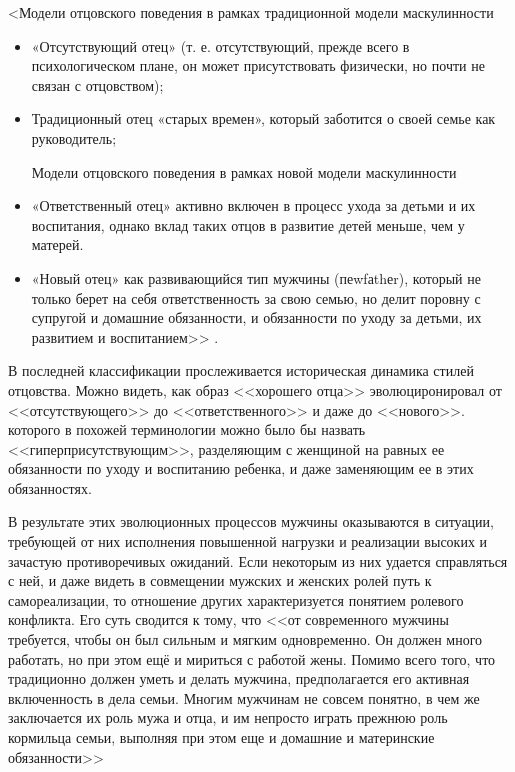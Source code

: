 \documentclass{../../common/thesisbyxetex}
\begin{document}
<Модели отцовского поведения в рамках традиционной модели маскулинности

\begin{itemize}

	\item «Отсутствующий отец» (т. е. отсутствующий, прежде всего в психологическом плане, он может
присутствовать физически, но почти не связан с отцовством);

\item Традиционный отец «старых времен», который заботится о своей семье как руководитель;

Модели отцовского поведения в рамках новой модели маскулинности
	\item «Ответственный отец» активно включен в процесс ухода за детьми и их воспитания, однако
вклад таких
отцов в развитие детей меньше, чем у матерей.
	\item «Новый отец» как развивающийся тип мужчины (пеwfаthеr), который не только берет на себя
ответственность за свою семью, но делит поровну с супругой и домашние обязанности, и обязанности по
уходу за детьми, их развитием и воспитанием>> \cite{clec}.

\end{itemize}

В последней классификации прослеживается историческая динамика стилей отцовства. Можно видеть, как
образ <<хорошего отца>> эволюциронировал от <<отсутствующего>>
до <<ответственного>> и даже до <<нового>>. которого в похожей терминологии можно было бы назвать
<<гиперприсутствующим>>, разделяющим с женщиной на равных ее обязанности по уходу и воспитанию
ребенка, и даже заменяющим ее в этих обязанностях.

В результате этих эволюционных процессов мужчины оказываются в ситуации, требующей от них
исполнения повышенной нагрузки и
реализации высоких и зачастую противоречивых ожиданий. Если некоторым из них удается справляться с
ней, и даже видеть в совмещении мужских и женских ролей путь к самореализации, то отношение других
характеризуется понятием ролевого конфликта. Его суть сводится к тому, что <<от современного мужчины
требуется, чтобы он был сильным и
мягким одновременно. Он должен много работать, но при этом ещё и мириться с работой
жены. Помимо всего того, что традиционно должен уметь и делать мужчина,
предполагается его активная включенность в дела семьи. Многим мужчинам не совсем
понятно, в чем же заключается их роль мужа и отца, и им непросто играть прежнюю роль
кормильца семьи, выполняя при этом еще и домашние и материнские обязанности>> \cite[112]{confl}
\end{document}
